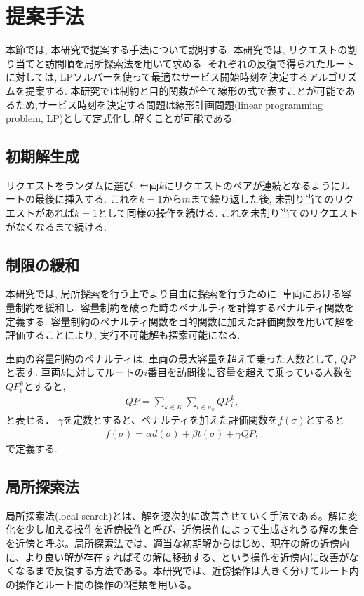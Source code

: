 \chapter{提案手法}\label{method}
本節では, 本研究で提案する手法について説明する. 本研究では, リクエストの割り当てと訪問順を局所探索法を用いて求める. それぞれの反復で得られたルートに対しては, LPソルバーを使って最適なサービス開始時刻を決定するアルゴリズムを提案する.
本研究では制約と目的関数が全て線形の式で表すことが可能であるため,サービス時刻を決定する問題は線形計画問題(linear programming problem, LP)として定式化し,解くことが可能である.
\section{初期解生成}
リクエストをランダムに選び, 車両$k$にリクエストのペアが連続となるようにルートの最後に挿入する. これを$k = 1 から m$まで繰り返した後, 未割り当てのリクエストがあれば$k = 1 $として同様の操作を続ける. これを未割り当てのリクエストがなくなるまで続ける.

\section{制限の緩和}
本研究では, 局所探索を行う上でより自由に探索を行うために, 車両における容量制約を緩和し, 容量制約を破った時のペナルティを計算するペナルティ関数を定義する. 容量制約のペナルティ関数を目的関数に加えた評価関数を用いて解を評価することにより, 実行不可能解も探索可能になる.

車両の容量制約のペナルティは, 車両の最大容量を超えて乗った人数として, $QP$と表す. 車両$k$に対してルートの$i$番目を訪問後に容量を超えて乗っている人数を$QP_i^k$とすると,
\begin{align*}
  QP = \sum_{k \in K}\sum_{i \in n_k} QP_i^k,
\end{align*}
と表せる．
$\gamma$を定数とすると、ペナルティを加えた評価関数を$f(\sigma)$とすると
\begin{align*}
  f(\sigma) = \alpha d(\sigma)+ \beta t(\sigma) + \gamma QP,
\end{align*}
で定義する.

\section{局所探索法}
局所探索法(local search)とは、解を逐次的に改善させていく手法である。解に変化を少し加える操作を近傍操作と呼び、近傍操作によって生成されうる解の集合を近傍と呼ぶ。局所探索法では、適当な初期解からはじめ、現在の解の近傍内に、より良い解が存在すればその解に移動する、という操作を近傍内に改善がなくなるまで反復する方法である。本研究では、近傍操作は大きく分けてルート内の操作とルート間の操作の2種類を用いる。

